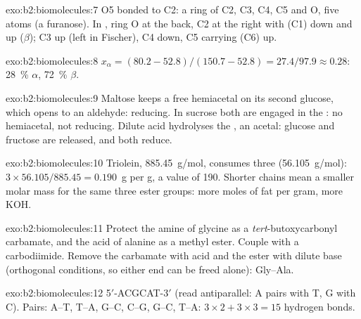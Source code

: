 \begin{solution}{exo:b2:biomolecules:7}
O5 bonded to C2: a ring of C2, C3, C4, C5 and O, five atoms (a furanose). In , ring O
at the back, C2 at the right with  (C1) down and  up ($\beta$); C3  up (left in
Fischer), C4  down, C5 carrying  (C6) up.
\end{solution}

\begin{solution}{exo:b2:biomolecules:8}
$x_\alpha = (80.2 - 52.8)/(150.7 - 52.8) = 27.4/97.9 \approx 0.28$: 28~\% $\alpha$, 72~\% $\beta$.
\end{solution}

\begin{solution}{exo:b2:biomolecules:9}
Maltose keeps a free hemiacetal on its second glucose, which opens to an aldehyde: reducing. In sucrose
both  are engaged in the : no hemiacetal, not reducing. Dilute acid
hydrolyses the , an acetal: glucose and fructose are released, and both reduce.
\end{solution}

\begin{solution}{exo:b2:biomolecules:10}
Triolein, \qty{885.45}{g/mol}, consumes three  (\qty{56.105}{g/mol}): $3 \times 56.105/885.45 =
0.190$~g per g, a  value of 190. Shorter chains mean a smaller molar mass for the same
three ester groups: more moles of fat per gram, more KOH.
\end{solution}

\begin{solution}{exo:b2:biomolecules:11}
Protect the amine of glycine as a \textit{tert}-butoxycarbonyl carbamate, and the acid of alanine as a
methyl ester. Couple with a carbodiimide. Remove the carbamate with acid and the ester with dilute base
(orthogonal conditions, so either end can be freed alone): Gly--Ala.
\end{solution}

\begin{solution}{exo:b2:biomolecules:12}
5$'$-ACGCAT-3$'$ (read antiparallel: A pairs with T, G with C). Pairs: A--T, T--A, G--C, C--G, G--C, T--A:
$3 \times 2 + 3 \times 3 = 15$ hydrogen bonds.
\end{solution}

